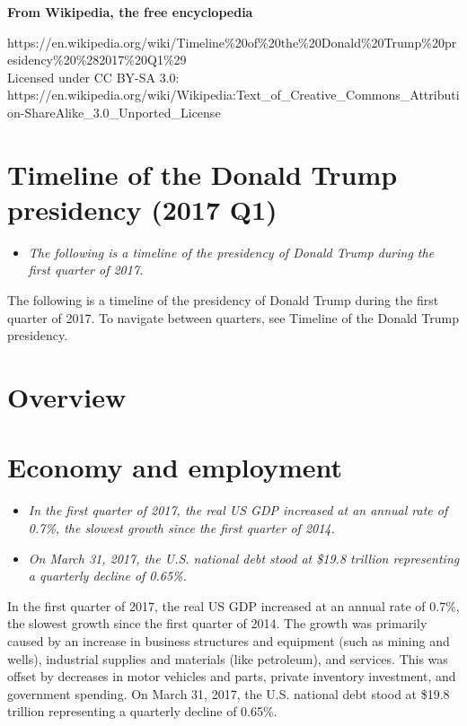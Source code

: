 \textbf{From Wikipedia, the free encyclopedia}

https://en.wikipedia.org/wiki/Timeline\%20of\%20the\%20Donald\%20Trump\%20presidency\%20\%282017\%20Q1\%29\\
Licensed under CC BY-SA 3.0:\\
https://en.wikipedia.org/wiki/Wikipedia:Text\_of\_Creative\_Commons\_Attribution-ShareAlike\_3.0\_Unported\_License

\section{Timeline of the Donald Trump presidency (2017
Q1)}\label{timeline-of-the-donald-trump-presidency-2017-q1}

\begin{itemize}
\item
  \emph{The following is a timeline of the presidency of Donald Trump
  during the first quarter of 2017.}
\end{itemize}

The following is a timeline of the presidency of Donald Trump during the
first quarter of 2017. To navigate between quarters, see Timeline of the
Donald Trump presidency.

\section{Overview}\label{overview}

\section{Economy and employment}\label{economy-and-employment}

\begin{itemize}
\item
  \emph{In the first quarter of 2017, the real US GDP increased at an
  annual rate of 0.7\%, the slowest growth since the first quarter of
  2014.}
\item
  \emph{On March 31, 2017, the U.S. national debt stood at \$19.8
  trillion representing a quarterly decline of 0.65\%.}
\end{itemize}

In the first quarter of 2017, the real US GDP increased at an annual
rate of 0.7\%, the slowest growth since the first quarter of 2014. The
growth was primarily caused by an increase in business structures and
equipment (such as mining and wells), industrial supplies and materials
(like petroleum), and services. This was offset by decreases in motor
vehicles and parts, private inventory investment, and government
spending. On March 31, 2017, the U.S. national debt stood at \$19.8
trillion representing a quarterly decline of 0.65\%.


